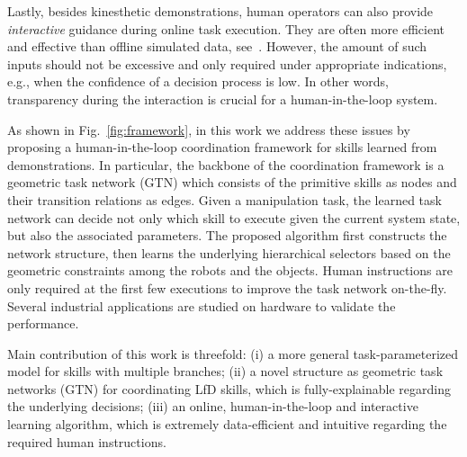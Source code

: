 Lastly, besides kinesthetic demonstrations, human operators can also provide \emph{interactive} guidance during online task execution. 
They are often more efficient and effective than offline simulated data,
see~\cite{xin2018accelerating, holzinger2016interactive}.
However, the amount of such inputs should not be excessive and only required under appropriate indications, e.g., when the confidence of a decision process is low. 
In other words, transparency during the interaction is crucial for a human-in-the-loop system.

As shown in Fig.~\ref{fig:framework}, in this work we address these issues by proposing a human-in-the-loop coordination framework for skills learned from demonstrations. 
In particular, the backbone of the coordination framework is a geometric task network (GTN) which consists of the primitive skills as nodes and their transition relations as edges.  
Given a manipulation task, the learned task network can decide not only which skill to execute given the current system state, 
but also the associated parameters. 
The proposed algorithm first constructs the network structure, 
then learns the underlying hierarchical selectors based on the geometric constraints among the robots and the objects.
Human instructions are only required at the first few executions to improve the task network on-the-fly.
Several industrial applications are studied on hardware to validate the performance.


Main contribution of this work is threefold:
(i) a more general task-parameterized model for skills with multiple branches;
(ii) a novel structure as geometric task networks (GTN) for coordinating LfD skills, which is 
fully-explainable regarding the underlying decisions;
(iii) an online, human-in-the-loop and interactive learning algorithm, which is {extremely} data-efficient and intuitive regarding the required human instructions.


